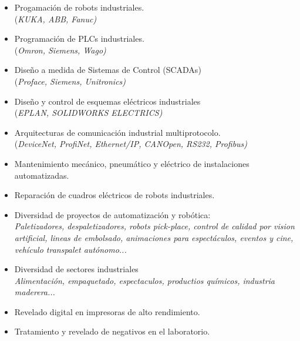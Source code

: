 \begin{itemize}
\item Progamación de robots industriales.\\
(\itshape{KUKA}, \itshape{ABB}, \itshape{Fanuc})
\item Programación de PLCs industriales.\\
(\itshape{Omron}, \itshape{Siemens}, \itshape{Wago})
\item Diseño a medida de Sistemas de Control (SCADAs)\\
(\itshape{Proface}, \itshape{Siemens}, \itshape{Unitronics})
\item Diseño y control de esquemas eléctricos industriales\\
(\itshape{EPLAN}, \itshape{SOLIDWORKS ELECTRICS})
\item Arquitecturas de comunicación industrial multiprotocolo.\\
(\itshape{DeviceNet}, \itshape{ProfiNet}, \itshape{Ethernet/IP}, \itshape{CANOpen}, \itshape{RS232}, \itshape{Profibus})
\item Mantenimiento mecánico, pneumático y eléctrico de instalaciones automatizadas.\\
\item Reparación de cuadros eléctricos de robots industriales.\\
\item Diversidad de proyectos de automatización y robótica:\\
\itshape{\small Paletizadores, despaletizadores, robots pick-place, control de calidad por vision
artificial, lineas de embolsado, animaciones para espectáculos, eventos y cine,
vehículo transpalet autónomo...}
\item Diversidad de sectores industriales\\
\itshape{\small Alimentación, empaquetado, espectaculos, productios químicos, industria maderera...}
\end{itemize}

\divider

\begin{itemize}
\item Revelado digital en impresoras de alto rendimiento.
\item Tratamiento y revelado de negativos en el laboratorio.
\end{itemize}
\divider

